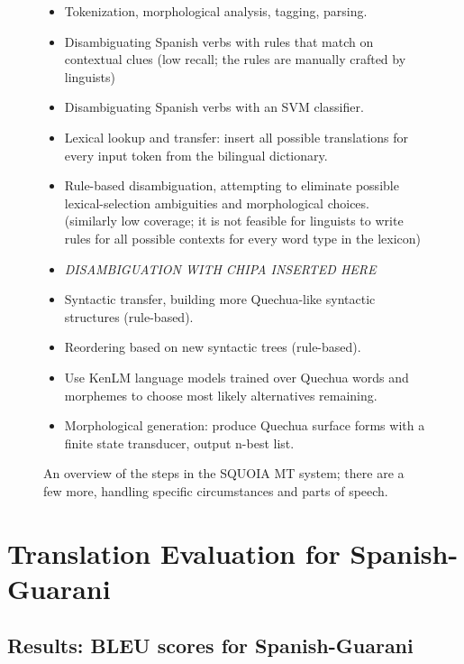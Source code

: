 \begin{figure}
  \begin{itemize}
  \item Tokenization, morphological analysis, tagging, parsing.
  \item Disambiguating Spanish verbs with rules that match on contextual clues
  (low recall; the rules are manually crafted by linguists)
  \item Disambiguating Spanish verbs with an SVM classifier.
  \item Lexical lookup and transfer: insert all possible translations for every
  input token from the bilingual dictionary.
  \item Rule-based disambiguation, attempting to eliminate possible
  lexical-selection ambiguities and morphological choices. (similarly low
  coverage; it is not feasible for linguists to write rules for all possible
  contexts for every word type in the lexicon)
  \item \emph{DISAMBIGUATION WITH CHIPA INSERTED HERE}
  \item Syntactic transfer, building more Quechua-like syntactic structures
  (rule-based).
  \item Reordering based on new syntactic trees (rule-based).
  \item Use KenLM language models trained over Quechua words and morphemes to
  choose most likely alternatives remaining.
  \item Morphological generation: produce Quechua surface forms with a finite
  state transducer, output n-best list.
  \end{itemize}

  \caption{An overview of the steps in the SQUOIA MT system; there are a few
  more, handling specific circumstances and parts of speech.}
  \label{fig:squoia-steps}
\end{figure}


\section{Translation Evaluation for Spanish-Guarani}


\subsection{Results: BLEU scores for Spanish-Guarani}

